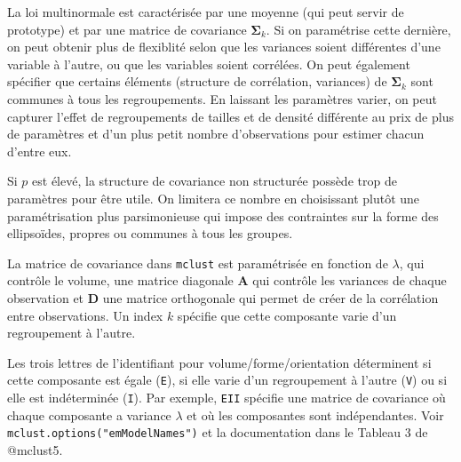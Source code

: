 \documentclass[
  11pt,
  letterpaper,
]{book}
\theoremstyle{definition}
\theoremstyle{remark}
\begin{document}
La loi multinormale est caractérisée par une moyenne (qui peut servir de
prototype) et par une matrice de covariance \(\boldsymbol{\Sigma}_k\).
Si on paramétrise cette dernière, on peut obtenir plus de flexiblité
selon que les variances soient différentes d'une variable à l'autre, ou
que les variables soient corrélées. On peut également spécifier que
certains éléments (structure de corrélation, variances) de
\(\boldsymbol{\Sigma}_k\) sont communes à tous les regroupements. En
laissant les paramètres varier, on peut capturer l'effet de
regroupements de tailles et de densité différente au prix de plus de
paramètres et d'un plus petit nombre d'observations pour estimer chacun
d'entre eux.

Si \(p\) est élevé, la structure de covariance non structurée possède
trop de paramètres pour être utile. On limitera ce nombre en choisissant
plutôt une paramétrisation plus parsimonieuse qui impose des contraintes
sur la forme des ellipsoïdes, propres ou communes à tous les groupes.

La matrice de covariance dans \texttt{mclust} est paramétrisée en
fonction de \(\lambda\), qui contrôle le volume, une matrice diagonale
\(\mathbf{A}\) qui contrôle les variances de chaque observation et
\(\mathbf{D}\) une matrice orthogonale qui permet de créer de la
corrélation entre observations. Un index \(k\) spécifie que cette
composante varie d'un regroupement à l'autre.

Les trois lettres de l'identifiant pour volume/forme/orientation
déterminent si cette composante est égale (\texttt{E}), si elle varie
d'un regroupement à l'autre (\texttt{V}) ou si elle est indéterminée
(\texttt{I}). Par exemple, \texttt{EII} spécifie une matrice de
covariance où chaque composante a variance \(\lambda\) et où les
composantes sont indépendantes. Voir
\texttt{mclust.options("emModelNames")} et la documentation dans le
Tableau 3 de @mclust5.
\end{document}
